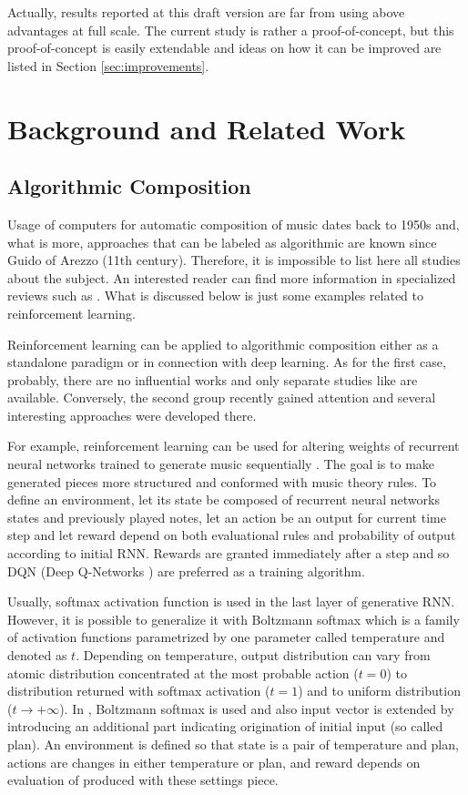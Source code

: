 \documentclass{article}
\begin{document}
Actually, results reported at this draft version are far from using above advantages at full scale. The current study is rather a proof-of-concept, but this proof-of-concept is easily extendable and ideas on how it can be improved are listed in Section \ref{sec:improvements}.


\section{Background and Related Work}
\label{sec:literature}

\subsection{Algorithmic Composition}
\label{subsec:composition}

Usage of computers for automatic composition of music dates back to 1950s and, what is more, approaches that can be labeled as algorithmic are known since Guido of Arezzo (11th century). Therefore, it is impossible to list here all studies about the subject. An interested reader can find more information in specialized reviews such as \cite{fernandez2013ai}. What is discussed below is just some examples related to reinforcement learning.

Reinforcement learning can be applied to algorithmic composition either as a standalone paradigm or in connection with deep learning. As for the first case, probably, there are no influential works and only separate studies like \cite{yi2007automatic} are available. Conversely, the second group recently gained attention and several interesting approaches were developed there.

For example, reinforcement learning can be used for altering weights of recurrent neural networks trained to generate music sequentially \cite{jaques2016generating, kotecha2018bach}. The goal is to make generated pieces more structured and conformed with music theory rules. To define an environment, let its state be composed of recurrent neural networks states and previously played notes, let an action be an output for current time step and let reward depend on both evaluational rules and probability of output according to initial RNN. Rewards are granted immediately after a step and so DQN (Deep Q-Networks \cite{mnih2013playing}) are preferred as a training algorithm.

Usually, softmax activation function is used in the last layer of generative RNN. However, it is possible to generalize it with Boltzmann softmax which is a family of activation functions parametrized by one parameter called temperature and denoted as $t$. Depending on temperature, output distribution can vary from atomic distribution concentrated at the most probable action ($t = 0$) to distribution returned with softmax activation ($t = 1$) and to uniform distribution ($t \to +\infty$). In \cite{kumar2019polyphonic}, Boltzmann softmax is used and also input vector is extended by introducing an additional part indicating origination of initial input (so called plan). An environment is defined so that state is a pair of temperature and plan, actions are changes in either temperature or plan, and reward depends on evaluation of produced with these settings piece.
\end{document}
